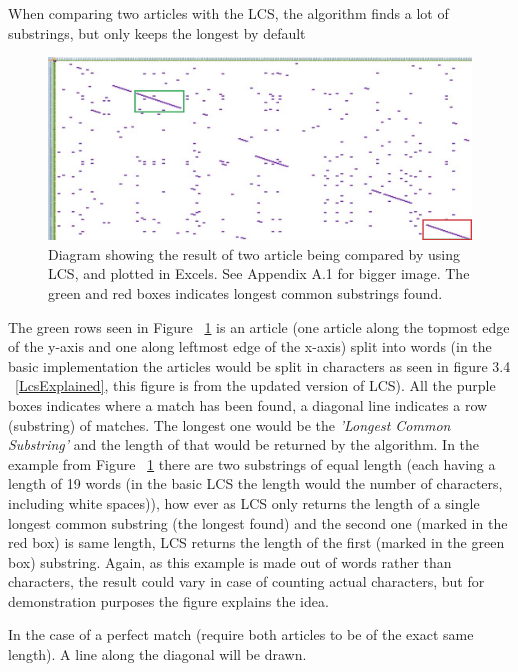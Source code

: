 When comparing two articles with the LCS, the algorithm finds a lot of substrings, but only keeps the longest by default
\begin{figure}
	\centering
	\includegraphics[scale=0.4]{figures/LcsExample}
	\caption{Diagram showing the result of two article being compared by using LCS, and plotted in Excels. See Appendix A.1 for bigger image. The green and red boxes indicates longest common substrings found.}
	\label{LcsEx}
\end{figure}

The green rows seen in Figure ~\ref{LcsEx} is an article (one article along the topmost edge of the y-axis and one along leftmost edge of the x-axis) split into words (in the basic implementation the articles would be split in characters as seen in figure 3.4 ~\ref{LcsExplained}, this figure is from the updated version of LCS). All the purple boxes indicates where a match has been found, a diagonal line indicates a row (substring) of matches. The longest one would be the \textit{'Longest Common Substring'} and the length of that would be returned by the algorithm. In the example from Figure ~\ref{LcsEx} there are two substrings of equal length (each having a length of 19 words (in the basic LCS the length would the number of characters, including white spaces)), how ever as LCS only returns the length of a single longest common substring (the longest found) and the second one (marked in the red box) is same length, LCS returns the length of the first (marked in the green box) substring. Again, as this example is made out of words rather than characters, the result could vary in case of counting actual characters, but for demonstration purposes the figure explains the idea.

In the case of a perfect match (require both articles to be of the exact same length). A line along the diagonal will be drawn.

